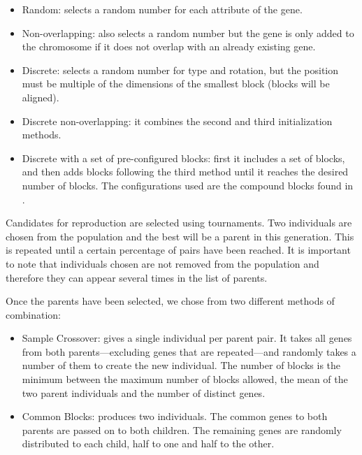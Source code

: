 \documentclass[a4paper,twoside]{article}
\begin{document}
\begin{itemize}
	\item Random: selects a random number for each attribute of the gene.
	\item Non-overlapping: also selects a random number but the gene is only 
	added to the chromosome if it does not overlap with an already existing 
	gene.
	\item Discrete: selects a random number for type and rotation, but the 
	position must be multiple of the dimensions of the smallest block (blocks 
	will be aligned).
	\item Discrete non-overlapping: it combines the second and third 
	initialization methods.
	\item Discrete with a set of pre-configured blocks: first it includes
	a set of blocks, and then adds blocks following the third method until
	it reaches the desired number of blocks. The configurations used are the
	compound blocks found in \cite{ferreira2014search}.
\end{itemize}

Candidates for reproduction are selected using tournaments. Two individuals are chosen from the 
population and the best will be a parent in this generation. This is 
repeated until a certain percentage of pairs have been reached. It is important 
to note that individuals chosen are not removed from the population and 
therefore they can appear several times in the list of parents. 

Once the parents have been selected, we chose from two different methods of 
combination:
\begin{itemize}
	\item Sample Crossover: gives a single individual per parent pair. It takes 
	all genes from both parents---excluding genes that are repeated---and 
	randomly takes a number of them to create the new individual. The number of 
	blocks is the minimum between the maximum number of blocks allowed, the 
	mean of the two parent individuals and the number of distinct genes.
	\item Common Blocks: produces two individuals. The common genes to both 
	parents are passed on to both children. The remaining genes are randomly 
	distributed to each child, half to one and half to the other. 
	\label{ga:cross2}
\end{itemize}
\end{document}
